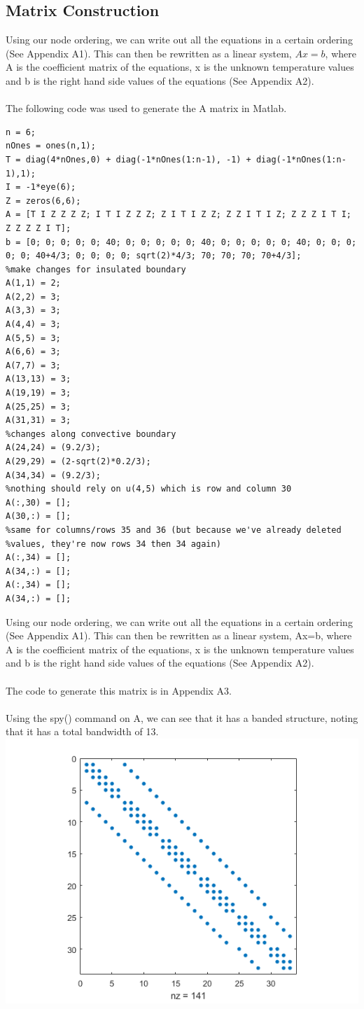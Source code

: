 \documentclass[12pt,a4paper]{article}
\begin{document}
\subsection{Matrix Construction}
Using our node ordering, we can write out all the equations in a certain ordering (See Appendix A1). This can then be rewritten as a linear system, $Ax=b$, where A is the coefficient matrix of the equations, x is the unknown temperature values and b is the right hand side values of the equations (See Appendix A2). \\\\
The following code was used to generate the A matrix in Matlab.
\pagebreak
\begin{verbatim}
n = 6;
nOnes = ones(n,1);
T = diag(4*nOnes,0) + diag(-1*nOnes(1:n-1), -1) + diag(-1*nOnes(1:n-1),1);
I = -1*eye(6);
Z = zeros(6,6);
A = [T I Z Z Z Z; I T I Z Z Z; Z I T I Z Z; Z Z I T I Z; Z Z Z I T I; Z Z Z Z I T];
b = [0; 0; 0; 0; 0; 40; 0; 0; 0; 0; 0; 40; 0; 0; 0; 0; 0; 40; 0; 0; 0; 0; 0; 40+4/3; 0; 0; 0; 0; sqrt(2)*4/3; 70; 70; 70; 70+4/3];
%make changes for insulated boundary
A(1,1) = 2;
A(2,2) = 3;
A(3,3) = 3;
A(4,4) = 3;
A(5,5) = 3;
A(6,6) = 3;
A(7,7) = 3;
A(13,13) = 3;
A(19,19) = 3;
A(25,25) = 3;
A(31,31) = 3;
%changes along convective boundary
A(24,24) = (9.2/3);
A(29,29) = (2-sqrt(2)*0.2/3);
A(34,34) = (9.2/3);
%nothing should rely on u(4,5) which is row and column 30
A(:,30) = [];
A(30,:) = [];
%same for columns/rows 35 and 36 (but because we've already deleted
%values, they're now rows 34 then 34 again)
A(:,34) = [];
A(34,:) = [];
A(:,34) = [];
A(34,:) = [];
\end{verbatim}
Using our node ordering, we can write out all the equations in a certain ordering (See Appendix A1). This can then be rewritten as a linear system, Ax=b, where A is the coefficient matrix of the equations, x is the unknown temperature values and b is the right hand side values of the equations (See Appendix A2). \\\\
The code to generate this matrix is in Appendix A3.\\\\Using the spy() command on A, we can see that it has a banded structure, noting that it has a total bandwidth of 13.\\\includegraphics{images/spyA.png}
\end{document}

